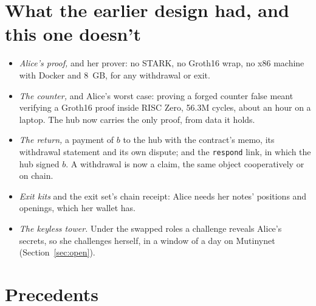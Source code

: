 \documentclass[11pt]{article}
\newcommand{\tx}[1]{\texttt{#1}}
\begin{document}
\section{What the earlier design had, and this one doesn't}
\label{sec:gone}

\begin{itemize}[leftmargin=1.5em]
\item \emph{Alice's proof,} and her prover: no STARK, no Groth16 wrap,
  no x86 machine with Docker and 8~GB, for any withdrawal or exit.
\item \emph{The counter,} and Alice's worst case: proving a forged
  counter false meant verifying a Groth16 proof inside RISC Zero, 56.3M
  cycles, about an hour on a laptop. The hub now carries the only
  proof, from data it holds.
\item \emph{The return,} a payment of $b$ to the hub with the contract's
  memo, its withdrawal statement and its own dispute; and the
  \tx{respond} link, in which the hub signed $b$. A withdrawal is now a
  claim, the same object cooperatively or on chain.
\item \emph{Exit kits} and the exit set's chain receipt: Alice needs her
  notes' positions and openings, which her wallet has.
\item \emph{The keyless tower.} Under the swapped roles a challenge
  reveals Alice's secrets, so she challenges herself, in a window of a
  day on Mutinynet (Section~\ref{sec:open}).
\end{itemize}

\section{Precedents}
\label{sec:precedents}
\end{document}

